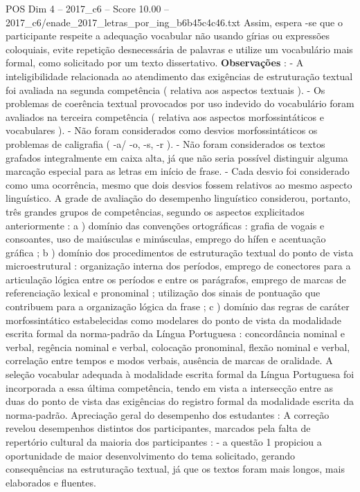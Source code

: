 \begin{textsample}{POS Dim 4 – 2017\_c6 – Score 10.00 – 2017\_c6/enade\_2017\_letras\_por\_ing\_b6b45c4c46.txt}
Assim, espera -se que o participante respeite a adequação vocabular não usando gírias ou expressões coloquiais, evite repetição desnecessária de palavras e utilize um vocabulário mais formal, como solicitado por um texto dissertativo. \textbf{Observações} : - A inteligibilidade relacionada ao atendimento das exigências de estruturação textual foi avaliada na segunda competência ( relativa aos aspectos textuais ). - Os problemas de coerência textual provocados por uso indevido do vocabulário foram avaliados na terceira competência ( relativa aos aspectos morfossintáticos e vocabulares ). - Não foram considerados como desvios morfossintáticos os problemas de caligrafia ( -a/ -o, -s, -r ). - Não foram considerados os textos grafados integralmente em caixa alta, já que não seria possível distinguir alguma marcação especial para as letras em início de frase. - Cada desvio foi considerado como uma ocorrência, mesmo que dois desvios fossem relativos ao mesmo aspecto linguístico.
A grade de avaliação do desempenho linguístico considerou, portanto, três grandes grupos de competências, segundo os aspectos explicitados anteriormente : a ) domínio das convenções ortográficas : grafia de vogais e consoantes, uso de maiúsculas e minúsculas, emprego do hífen e acentuação gráfica ; b ) domínio dos procedimentos de estruturação textual do ponto de vista microestrutural : organização interna dos períodos, emprego de conectores para a articulação lógica entre os períodos e entre os parágrafos, emprego de marcas de referenciação lexical e pronominal ; utilização dos sinais de pontuação que contribuem para a organização lógica da frase ; c ) domínio das regras de caráter morfossintático estabelecidas como modelares do ponto de vista da modalidade escrita formal da norma-padrão da Língua Portuguesa : concordância nominal e verbal, regência nominal e verbal, colocação pronominal, flexão nominal e verbal, correlação entre tempos e modos verbais, ausência de marcas de oralidade.
A seleção vocabular adequada à modalidade escrita formal da Língua Portuguesa foi incorporada a essa última competência, tendo em vista a intersecção entre as duas do ponto de vista das exigências do registro formal da modalidade escrita da norma-padrão.
Apreciação geral do desempenho dos estudantes : A correção revelou desempenhos distintos dos participantes, marcados pela falta de repertório cultural da maioria dos participantes : - a questão 1 propiciou a oportunidade de maior desenvolvimento do tema solicitado, gerando consequências na estruturação textual, já que os textos foram mais longos, mais elaborados e fluentes.

\end{textsample}
